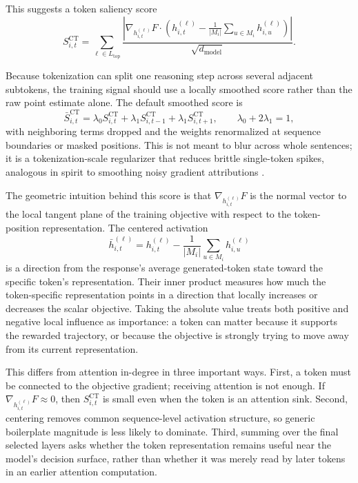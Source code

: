 \documentclass[11pt]{article}
\begin{document}
This suggests a token saliency score
\begin{equation}
  S^{\mathrm{CT}}_{i,t}
  =
  \sum_{\ell \in L_{\mathrm{top}}}
  \frac{
    \left|
      \nabla_{h^{(\ell)}_{i,t}} F
      \cdot
      \left(
        h^{(\ell)}_{i,t}
        -
        \frac{1}{|M_i|}
        \sum_{u \in M_i} h^{(\ell)}_{i,u}
      \right)
    \right|
  }{\sqrt{d_{\mathrm{model}}}}.
\end{equation}

Because tokenization can split one reasoning step across several adjacent
subtokens, the training signal should use a locally smoothed score rather than
the raw point estimate alone. The default smoothed score is
\begin{equation}
  \bar{S}^{\mathrm{CT}}_{i,t}
  =
  \lambda_0 S^{\mathrm{CT}}_{i,t}
  +
  \lambda_1 S^{\mathrm{CT}}_{i,t-1}
  +
  \lambda_1 S^{\mathrm{CT}}_{i,t+1},
  \qquad
  \lambda_0 + 2\lambda_1 = 1,
\end{equation}
with neighboring terms dropped and the weights renormalized at sequence
boundaries or masked positions. This is not meant to blur across whole
sentences; it is a tokenization-scale regularizer that reduces brittle
single-token spikes, analogous in spirit to smoothing noisy gradient
attributions \cite{smilkov2017smoothgrad}.

The geometric intuition behind this score is that
$\nabla_{h^{(\ell)}_{i,t}}F$ is the normal vector to the local tangent plane of
the training objective with respect to the token-position representation. The
centered activation
\begin{equation}
  \bar{h}^{(\ell)}_{i,t}
  =
  h^{(\ell)}_{i,t}
  -
  \frac{1}{|M_i|}
  \sum_{u \in M_i} h^{(\ell)}_{i,u}
\end{equation}
is a direction from the response's average generated-token state toward the
specific token's representation. Their inner product measures how much the
token-specific representation points in a direction that locally increases or
decreases the scalar objective. Taking the absolute value treats both positive
and negative local influence as importance: a token can matter because it
supports the rewarded trajectory, or because the objective is strongly trying
to move away from its current representation.

This differs from attention in-degree in three important ways. First, a token
must be connected to the objective gradient; receiving attention is not enough.
If $\nabla_{h^{(\ell)}_{i,t}}F \approx 0$, then
$S^{\mathrm{CT}}_{i,t}$ is small even when the token is an attention sink.
Second, centering removes common sequence-level activation structure, so generic
boilerplate magnitude is less likely to dominate. Third, summing over the final
selected layers asks whether the token representation remains useful near the
model's decision surface, rather than whether it was merely read by later
tokens in an earlier attention computation.
\end{document}
